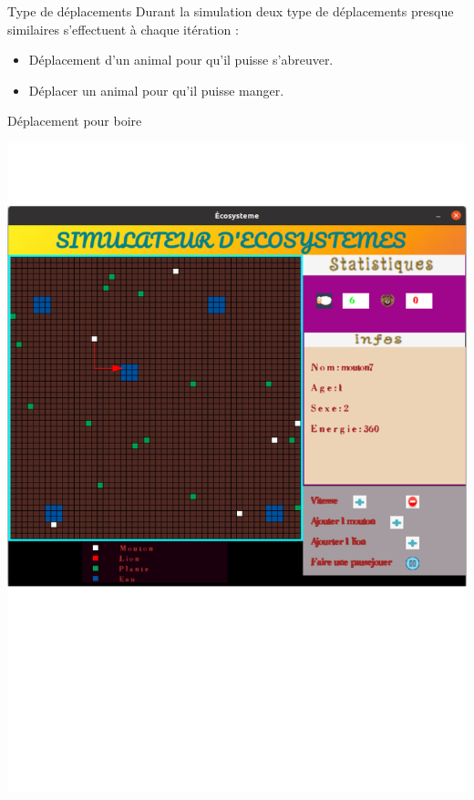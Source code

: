 \documentclass{beamer}
\begin{document}
\begin{frame}{Type de déplacements }
    Durant la simulation deux type de déplacements presque similaires s'effectuent à chaque itération : \\
    \vspace{0.3cm}
    \begin{itemize}
        \item Déplacement d'un animal pour qu’il puisse s’abreuver.
        \vspace{0.3cm}
        \item Déplacer un animal pour qu’il puisse manger.
    \end{itemize}
\end{frame}
\begin{frame}{Déplacement pour boire}
    \begin{center}
            \includegraphics[keepaspectratio, scale=0.22]{images/depb.png}
    \end{center}
\end{frame}
\end{document}
